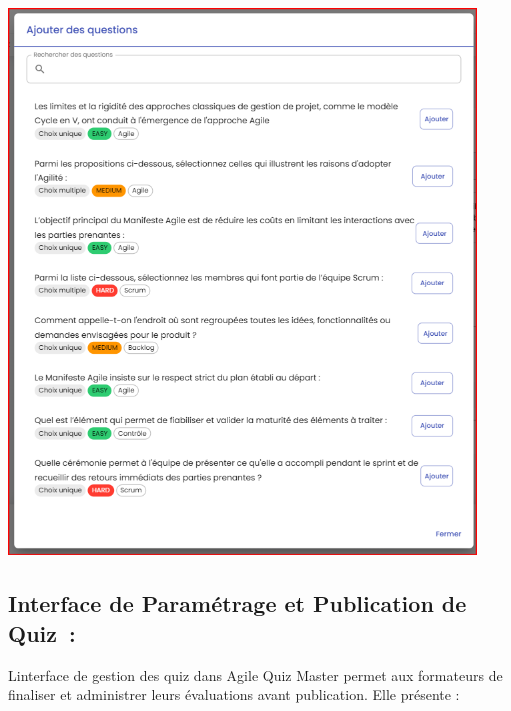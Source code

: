 \documentclass[12pt,a4paper,twoside]{report}
\begin{document}
\includegraphics[width=4.88219in,height=5.70168in]{latex_media/media/image57.png}

\hypertarget{interface-de-paramuxe9trage-et-publication-de-quiz}{%
\subsection{Interface de Paramétrage et Publication de
Quiz~:}\label{interface-de-paramuxe9trage-et-publication-de-quiz}}

L\textquotesingle interface de gestion des quiz dans Agile Quiz Master
permet aux formateurs de finaliser et administrer leurs évaluations
avant publication. Elle présente :
\end{document}
